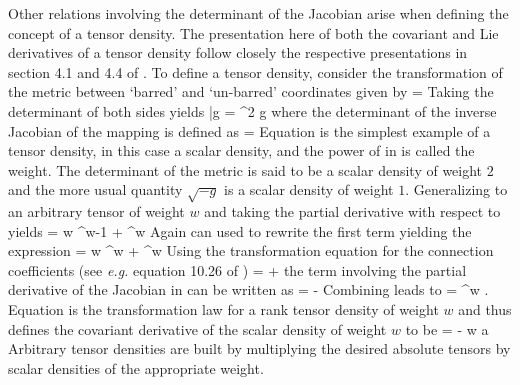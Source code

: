 Other relations involving the determinant of the Jacobian arise when defining the
concept of a tensor density.
The presentation here of both the covariant and Lie derivatives of a tensor density follow
closely the respective presentations in section 4.1 and 4.4 of .
To define a tensor density, consider the transformation of the metric between `barred'
and `un-barred' coordinates given by
\be
 \met{\gbm \gbn} = \jac{\gbm}{\ga} \jac{\gbn}{\gb} \met{\ga \gb} \eqp
\ee
Taking the determinant of both sides yields
\be\label{eq:D8}
  {\bar g} = \mJ^2 g \eqp
\ee
where the determinant of the inverse Jacobian of the mapping \mJ \nudge is defined as
\be
  \mJ =  \eqp
\ee
Equation  is the simplest example of a tensor density, in this case a scalar
density, and the power of \mJ \nudge in  is called the weight.
The determinant of the metric is said to be a scalar density
of weight $2$ and the more usual quantity $\sqrt{-g}$ is a scalar density of weight $1$.
Generalizing  to an arbitrary tensor  of
weight $w$ and taking the partial
derivative with respect to  yields
\be
   = w \mJ^{w-1} \pdxby{\mJ}{\jac{\gbm}{\gn}}
                             + \mJ^w   \eqp
\ee
Again  can used to rewrite the first term yielding the expression
\be\label{eq:D9}
   = w \mJ^w \jac{\gn}{\gbm} \idx{\jac{\gbm}{\gn}}{\dn{,\gba}}
                             + \mJ^w   \eqp
\ee
Using the transformation equation for the connection coefficients (see \textit{e.g.}
equation 10.26 of )
\bes
\Cnx{\gbr}{\gba\gbt} = \Jac{\gm}{\gba} \Jac{\gn}{\gbt} \Jac{\gbr}{\gs} \Cnx{\gs}{\gm\gn}
                         +  \Jac{\gbr}{\gn} \eqc
\ees
the term involving the partial derivative of the Jacobian in  can be written
as
\bes
   \jac{\gn}{\gbm} \idx{\jac{\gbm}{\gn}}{\dn{,\gba}} =    \Cnx{\gbr}{\gbr\gba}
                                                       - \Jac{\gn}{\gba} \Cnx{\gs}{\gs \gn} \eqp
\ees
Combining leads to
\be\label{eq:D10}
 =
  \jac{\gba}{\gb} \mJ^w .
\ee
Equation  is the transformation law for a rank  tensor density
of weight $w$ and thus defines the covariant derivative of the scalar density of weight
$w$ to be
\be\label{eq:D11}
   =  - w \Cnx{\gs}{\gs \gb} a \eqp
\ee
Arbitrary tensor densities are built by multiplying the desired absolute tensors
by scalar densities of the appropriate weight.

